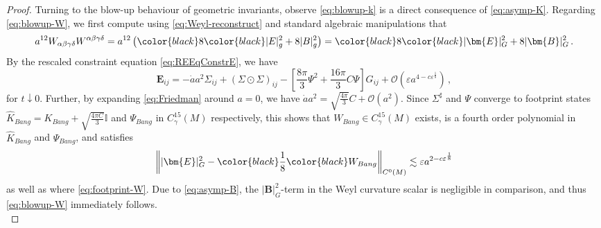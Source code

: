 \documentclass[11pt,leqno,textwidth=10cm]{amsart}
\numberwithin{equation}{section}
\theoremstyle{definition}
\theoremstyle{plain}
\newcommand{\1}{\mathbbm{1}}
\newcommand{\I}{\mathbb{I}}
\renewcommand{\O}[1]{\mathcal{O}\left(#1\right)}
\renewcommand{\epsilon}{\varepsilon}
\newcommand{\RE}{\bm{E}}
\newcommand{\RB}{\bm{B}}
\newcommand{\change}[1]{\color{black}#1\color{black}}
\begin{document}
\begin{proof}
Turning to the blow-up behaviour of geometric invariants, observe \eqref{eq:blowup-k} is a direct consequence of \eqref{eq:asymp-K}. Regarding \eqref{eq:blowup-W}, we first compute
using \eqref{eq:Weyl-reconstruct} and standard algebraic manipulations that
\[a^{12}W_{\alpha\beta\gamma\delta}W^{\alpha\beta\gamma\delta}=a^{12}\left(\change{8}\lvert E\rvert_g^2+8\lvert B\rvert_g^2\right)=\change{8}\lvert\RE\rvert_G^2+8\lvert\RB\rvert_G^2\,.\]
By the rescaled constraint equation \eqref{eq:REEqConstrE}, we have
\begin{equation*}
\RE_{ij}=-\dot{a}a^2\Sigma_{ij}+(\Sigma\odot\Sigma)_{ij}-\left[\frac{8\pi}3\Psi^2+\frac{16\pi}3C\Psi\right]G_{ij}+\O{\epsilon a^{4-c\epsilon^\frac18}}\,,
\end{equation*}
for $t\downarrow 0$. Further, by expanding \eqref{eq:Friedman} around $a=0$, we have 
$\dot{a}a^2=\sqrt{\frac{4\pi}3}C+\O{a^2}$.
Since $\Sigma^\sharp$ and $\Psi$ converge to footprint states $\hat{K}_{Bang}=K_{Bang}+\sqrt{\frac{4\pi C}3}\I$ and $\Psi_{Bang}$ in $C^{15}_\gamma(M)$ respectively, this shows that $W_{Bang}\in C^{15}_\gamma(M)$ exists, is a fourth order polynomial in $\hat{K}_{Bang}$ and $\Psi_{Bang}$, and satisfies
\[\left\|\lvert\RE\rvert_G^2-\change{\frac1{8}}W_{Bang}\right\|_{C^0(M)}\lesssim \epsilon a^{2-c\epsilon^\frac18}\]
as well as where \eqref{eq:footprint-W}. Due to \eqref{eq:asymp-B}, the $\lvert\RB\rvert_G^2$-term in the Weyl curvature scalar is negligible in comparison, and thus \eqref{eq:blowup-W} immediately follows.\\

\end{proof}
\end{document}
